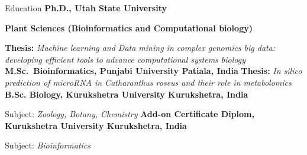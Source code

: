 \begin{rubric}{Education}
    \entryx[2019 --{} 2023 ]%
        \textbf{Ph.D., Utah State University} 
        \par\textbf{Plant Sciences (Bioinformatics and Computational biology)}
        \par \textbf{Thesis:} \emph{Machine learning and Data mining in complex genomics big data: developing efficient tools to advance computational systems biology}
    \entryx[2008 --{} 2010]%
        \textbf{M.Sc.~Bioinformatics, Punjabi University Patiala, India} 
        \textbf{Thesis:} \emph{In silico prediction of microRNA in Catharanthus roseus and their role in metabolomics}
    \entryx[2005 --{} 2008]%
        \textbf{B.Sc. Biology, Kurukshetra University Kurukshetra, India} \par
        Subject: \emph{Zoology, Botany, Chemistry}
    \entryx[2007 --{} 2008]%
        \textbf{Add-on Certificate Diplom, Kurukshetra University Kurukshetra, India} \par
        Subject: \emph{Bioinformatics}
    \end{rubric}